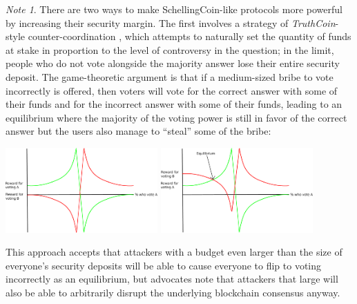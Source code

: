 \documentclass[11pt,a4paper]{report}
\theoremstyle{plain}
\theoremstyle{definition}
\theoremstyle{remark}
\newtheorem*{note}{Note}
\begin{document}
\begin{note}


There are two ways to make SchellingCoin-like protocols more powerful by increasing their security margin. The first involves a strategy of \emph{TruthCoin}-style counter-coordination \citep{sztorc_trustless_2014}, which attempts to naturally set the quantity of funds at stake in proportion to the level of controversy in the question; in the limit, people who do not vote alongside the majority answer lose their entire security deposit. The game-theoretic argument is that if a medium-sized bribe to vote incorrectly is offered, then voters will vote for the correct answer with some of their funds and for the incorrect answer with some of their funds, leading to an equilibrium where the majority of the voting power is still in favor of the correct answer but the users also manage to ``steal'' some of the bribe:

\begin{center}
\includegraphics[width=165pt]{figs/pdfs/schellingcoin_payoff1.pdf}
\includegraphics[width=165pt]{figs/pdfs/schellingcoin_payoff2.pdf}
\end{center}

This approach accepts that attackers with a budget even larger than the size of everyone's security deposits will be able to cause everyone to flip to voting incorrectly as an equilibrium, but advocates note that attackers that large will also be able to arbitrarily disrupt the underlying blockchain consensus anyway.


\end{note}
\end{document}
